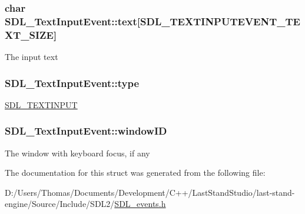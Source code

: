 \subsubsection[{text}]{\setlength{\rightskip}{0pt plus 5cm}char S\+D\+L\+\_\+\+Text\+Input\+Event\+::text\mbox{[}S\+D\+L\+\_\+\+T\+E\+X\+T\+I\+N\+P\+U\+T\+E\+V\+E\+N\+T\+\_\+\+T\+E\+X\+T\+\_\+\+S\+I\+Z\+E\mbox{]}}\label{structSDL__TextInputEvent_a1a95531f466dff01c2f108f53ff24554}
The input text \hypertarget{structSDL__TextInputEvent_a90576be2ea52e694deff40d0586654f5}{}
\subsubsection[{type}]{ S\+D\+L\+\_\+\+Text\+Input\+Event\+::type}\label{structSDL__TextInputEvent_a90576be2ea52e694deff40d0586654f5}
\hyperlink{SDL__events_8h_a3b589e89be6b35c02e0dd34a55f3fccaa4fa2570088f6b9cbd109ae91b511368f}{S\+D\+L\+\_\+\+T\+E\+X\+T\+I\+N\+P\+U\+T} \hypertarget{structSDL__TextInputEvent_aeb4f7a939353990ca40261ffbfbeb3d0}{}
\subsubsection[{window\+I\+D}]{ S\+D\+L\+\_\+\+Text\+Input\+Event\+::window\+I\+D}\label{structSDL__TextInputEvent_aeb4f7a939353990ca40261ffbfbeb3d0}
The window with keyboard focus, if any 

The documentation for this struct was generated from the following file\+:\begin{DoxyCompactItemize}
\item 
D\+:/\+Users/\+Thomas/\+Documents/\+Development/\+C++/\+Last\+Stand\+Studio/last-\/stand-\/engine/\+Source/\+Include/\+S\+D\+L2/\hyperlink{SDL__events_8h}{S\+D\+L\+\_\+events.\+h}\end{DoxyCompactItemize}
